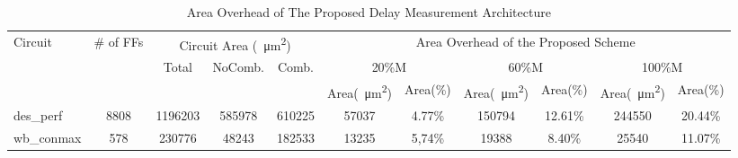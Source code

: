 \begin{table}[]
  \scriptsize
  \caption{Area Overhead of The Proposed Delay Measurement Architecture} \label{tab:area-overhead}
      \begin{tabular}{@{}l|c|ccccccccc}
          \hline
          \multirow{3}{*}{Circuit} & \multirow{3}{*}{\# of FFs} & \multicolumn{3}{c|}{Circuit Area (\SI{}{\micro\metre^2})}                                                            & \multicolumn{6}{c}{Area Overhead of the Proposed Scheme}                                                                                                                                                                         \\ \cline{3-11} 
                                   &                            & \multicolumn{1}{c}{\multirow{2}{*}{Total}} & \multicolumn{1}{c}{\multirow{2}{*}{NoComb.}} & \multicolumn{1}{c|}{\multirow{2}{*}{Comb.}} & \multicolumn{2}{c|}{20\%M}                                                       & \multicolumn{2}{c|}{60\%M}                                                       & \multicolumn{2}{c}{100\%M}                                 \\ \cline{6-11} 
                                                            &                            &                         &                          &  \multicolumn{1}{c|}{}                      & \multicolumn{1}{c}{Area(\SI{}{\micro\metre^2})} & \multicolumn{1}{c|}{Area(\%)} & \multicolumn{1}{c}{Area(\SI{}{\micro\metre^2})} & \multicolumn{1}{c|}{Area(\%)} & \multicolumn{1}{c}{Area(\SI{}{\micro\metre^2})} & Area(\%) \\ 
          \hline
                                                            des\_perf                & 8808                       & \multicolumn{1}{c}{1196203}                & \multicolumn{1}{c}{585978}                   & \multicolumn{1}{c|}{610225}                 & \multicolumn{1}{c}{57037}                       & \multicolumn{1}{c|}{4.77\%}   & \multicolumn{1}{c}{150794}                      & \multicolumn{1}{c|}{12.61\%}  & \multicolumn{1}{c}{244550}                      & 20.44\%  \\ 
                                                            wb\_conmax               & 578                        & \multicolumn{1}{c}{230776}                 & \multicolumn{1}{c}{48243}                    & \multicolumn{1}{c|}{182533}                & \multicolumn{1}{c}{13235}                       & \multicolumn{1}{c|}{5,74\%}   & \multicolumn{1}{c}{19388}                       & \multicolumn{1}{c|}{8.40\%}   & \multicolumn{1}{c}{25540}                       & 11.07\%  \\ 

\end{tabular}
\end{table}

